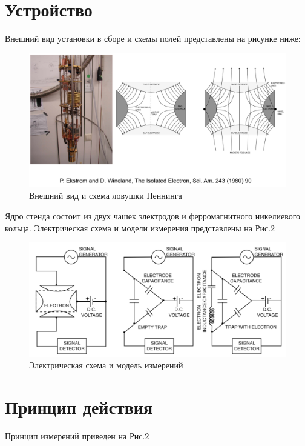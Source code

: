 \documentclass[11pt]{article}
\begin{document}
\section{Устройство}
Внешний вид установки в сборе и схемы полей представлены на рисунке ниже:
\begin{figure}[htp]
\centering
\includegraphics[scale=0.3]{penn_1.png}
\caption{Внешний вид и схема ловушки Пеннинга ~\cite{Courcera_NPh,Mart}}
\label{}
\end{figure}

Ядро стенда состоит из двух чашек электродов и ферромагнитного никелиевого кольца. Электрическая схема и модели измерения представлены на Рис.2 ~\cite{Courcera_NPh,Mart}\\

\begin{figure}[htp]
\centering
\includegraphics[scale=0.3]{penn_2.png}
\caption{Электрическая схема и модель измерений ~\cite{Courcera_NPh,Mart}}
\label{}
\end{figure}


\section{Принцип действия}
Принцип измерений приведен на Рис.2 \\
\end{document}
